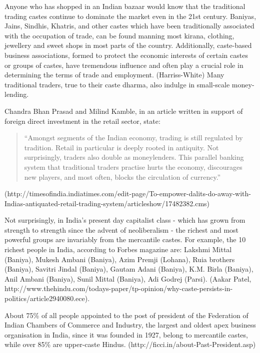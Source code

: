 \documentclass[]{article}
\begin{document}
Anyone who has shopped in an Indian bazaar would know that the
traditional trading castes continue to dominate the market even in the
21st century. Baniyas, Jains, Sindhis, Khatris, and other castes which
have been traditionally associated with the occupation of trade, can be
found manning most kirana, clothing, jewellery and sweet shops in most
parts of the country. Additionally, caste-based business associations,
formed to protect the economic interests of certain castes or groups of
castes, have tremendous influence and often play a crucial role in
determining the terms of trade and employment. (Harriss-White) Many
traditional traders, true to their caste dharma, also indulge in
small-scale money-lending.

Chandra Bhan Prasad and Milind Kamble, in an article written in support
of foreign direct investment in the retail sector, state:

\begin{quote}
``Amongst segments of the Indian economy, trading is still regulated by
tradition. Retail in particular is deeply rooted in antiquity. Not
surprisingly, traders also double as moneylenders. This parallel banking
system that traditional traders practise hurts the economy, discourages
new players, and most often, blocks the circulation of currency.''
\end{quote}

(http://timesofindia.indiatimes.com/edit-page/To-empower-dalits-do-away-with-Indias-antiquated-retail-trading-system/articleshow/17482382.cms)

Not surprisingly, in India's present day capitalist class - which has
grown from strength to strength since the advent of neoliberalism - the
richest and most powerful groups are invariably from the mercantile
castes. For example, the 10 richest people in India, according to Forbes
magazine are: Lakshmi Mittal (Baniya), Mukesh Ambani (Baniya), Azim
Premji (Lohana), Ruia brothers (Baniya), Savitri Jindal (Baniya), Gautam
Adani (Baniya), K.M. Birla (Baniya), Anil Ambani (Baniya), Sunil Mittal
(Baniya), Adi Godrej (Parsi). (Aakar Patel,
http://www.thehindu.com/todays-paper/tp-opinion/why-caste-persists-in-politics/article2940080.ece).

About 75\% of all people appointed to the post of president of the
Federation of Indian Chambers of Commerce and Industry, the largest and
oldest apex business organisation in India, since it was founded in
1927, belong to mercantile castes, while over 85\% are upper-caste
Hindus. (http://ficci.in/about-Past-President.asp)
\end{document}
